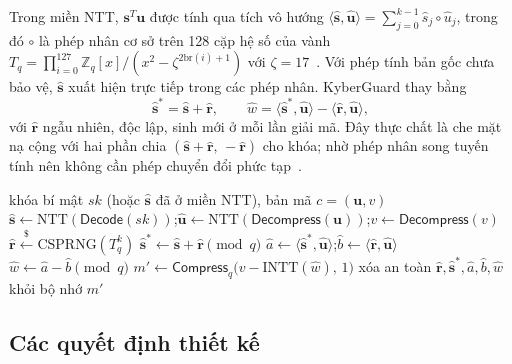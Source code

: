 \documentclass[../LuanVan.tex]{subfiles}
\begin{document}
Trong miền NTT, $\mathbf{s}^T\mathbf{u}$ được tính qua tích vô hướng $\langle\hat{\mathbf{s}},\hat{\mathbf{u}}\rangle=\sum_{j=0}^{k-1}\hat{s}_j\circ\hat{u}_j$, trong đó $\circ$ là phép nhân cơ sở trên 128 cặp hệ số của vành $T_q=\prod_{i=0}^{127}\mathbb{Z}_q[x]/(x^2-\zeta^{2\mathrm{br}(i)+1})$ với $\zeta=17$~\cite{Avanzi21}. Với phép tính bản gốc chưa bảo vệ, $\hat{\mathbf{s}}$ xuất hiện trực tiếp trong các phép nhân. KyberGuard thay bằng
\begin{equation}
\hat{\mathbf{s}}^{*}=\hat{\mathbf{s}}+\hat{\mathbf{r}},\qquad
\hat{w}=\langle\hat{\mathbf{s}}^{*},\hat{\mathbf{u}}\rangle-\langle\hat{\mathbf{r}},\hat{\mathbf{u}}\rangle,
\label{eq:blind}
\end{equation}
với $\hat{\mathbf{r}}$ ngẫu nhiên, độc lập, sinh mới ở mỗi lần giải mã. Đây thực chất là che mặt nạ cộng với hai phần chia $(\hat{\mathbf{s}}+\hat{\mathbf{r}},\,-\hat{\mathbf{r}})$ cho khóa; nhờ phép nhân song tuyến tính nên không cần phép chuyển đổi phức tạp~\cite{ChariJRR99,messerges2000}.
 
\begin{algorithm}[H]
\caption{Giải mã CPAPKE với cơ chế che mặt nạ ngẫu nhiên}
\label{alg:blind}
\begin{algorithmic}[1]
\Require khóa bí mật $sk$ (hoặc $\hat{\mathbf{s}}$ đã ở miền NTT), bản mã $c=(\mathbf{u},v)$
\State $\hat{\mathbf{s}}\gets \mathrm{NTT}(\mathsf{Decode}(sk))$;\quad $\hat{\mathbf{u}}\gets \mathrm{NTT}(\mathsf{Decompress}(\mathbf{u}))$;\quad $v\gets\mathsf{Decompress}(v)$
\State $\hat{\mathbf{r}}\xleftarrow{\$} \mathrm{CSPRNG}(T_q^{k})$ 
\State $\hat{\mathbf{s}}^{*}\gets\hat{\mathbf{s}}+\hat{\mathbf{r}} \pmod q$ 
\State $\hat{a}\gets\langle\hat{\mathbf{s}}^{*},\hat{\mathbf{u}}\rangle$;\quad $\hat{b}\gets\langle\hat{\mathbf{r}},\hat{\mathbf{u}}\rangle$ 
\State $\hat{w}\gets\hat{a}-\hat{b} \pmod q$ 
\State $m'\gets\mathsf{Compress}_q\big(v-\mathrm{INTT}(\hat{w}),\,1\big)$
\State xóa an toàn $\hat{\mathbf{r}},\hat{\mathbf{s}}^{*},\hat{a},\hat{b},\hat{w}$ khỏi bộ nhớ
\State \Return $m'$
\end{algorithmic}
\end{algorithm}
 
\subsection{Các quyết định thiết kế}
 
\end{document}
